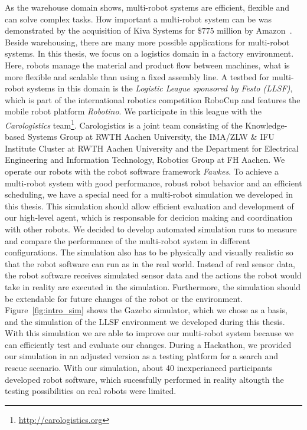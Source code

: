 As the warehouse domain shows, multi-robot systems are efficient, flexible and can solve complex tasks. How important a multi-robot system can be was demonstrated by the acquisition of Kiva Systems for $\$775$ million by Amazon~\cite{kiva_amazon}. Beside warehousing, there are many more possible applications for multi-robot systems. In this thesis, we focus on a logistics domain in a factory environment. Here, robots manage the material and product flow between machines, what is more flexible and scalable than using a fixed assembly line. A testbed for multi-robot systems in this domain is the \textit{Logistic League sponsored by Festo (LLSF)}, which is part of the international robotics competition RoboCup and features the mobile robot platform \textit{Robotino}. We participate in this league with the \textit{Carologistics} team\footnote{\url{http://carologistics.org}}. Carologistics is a joint team consisting of the Knowledge-based Systems Group at RWTH Aachen University, the IMA/ZLW \& IFU Institute Cluster at RWTH Aachen University and the Department for Electrical Engineering and Information Technology, Robotics Group at FH Aachen. We operate our robots with the robot software framework \textit{Fawkes}. To achieve a multi-robot system with good performance, robust robot behavior and an efficient scheduling, we have a special need for a multi-robot simulation we developed in this thesis. This simulation should allow efficient evaluation and development of our high-level agent, which is responsable for decicion making and coordination with other robots. We decided to develop automated simulation runs to measure and compare the performance of the multi-robot system in different configurations. The simulation also has to be physically and visually realistic so that the robot software can run as in the real world. Instead of real sensor data, the robot software receives simulated sensor data and the actions the robot would take in reality are executed in the simulation. Furthermore, the simulation should be extendable for future changes of the robot or the environment.\\
Figure~\ref{fig:intro_sim} shows the Gazebo simulator, which we chose as a basis, and the simulation of the LLSF environment we developed during this thesis. With this simulation we are able to improve our multi-robot system because we can efficiently test and evaluate our changes. During a Hackathon, we provided our simulation in an adjusted version as a testing platform for a search and rescue scenario. With our simulation, about 40 inexperianced participants developed robot software, which sucessfully performed in reality altougth the testing possibilities on real robots were limited. 
